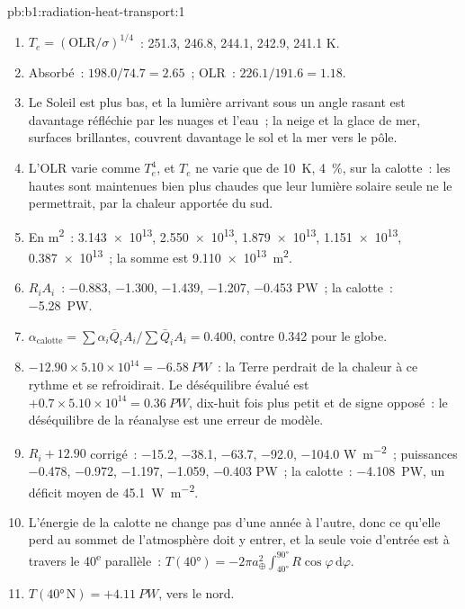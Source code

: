 \begin{solution}{pb:b1:radiation-heat-transport:1}
\begin{enumerate}
  \item $T_e = (\text{OLR}/\sigma)^{1/4}$~: \num{251.3}, \num{246.8}, \num{244.1},
        \num{242.9}, \num{241.1} \unit{K}.
  \item Absorbé~: $198.0/74.7 = 2.65$~; OLR~: $226.1/191.6 = 1.18$.
  \item Le Soleil est plus bas, et la lumière arrivant sous un angle rasant est davantage réfléchie
        par les nuages et l'eau~; la neige et la glace de mer, surfaces brillantes, couvrent davantage le
        sol et la mer vers le pôle.
  \item L'OLR varie comme $T_e^4$, et $T_e$ ne varie que de \qty{10}{K}, \qty{4}{\percent},
        sur la calotte~: les hautes  sont maintenues bien plus chaudes que leur lumière solaire
        seule ne le permettrait, par la chaleur apportée du sud.
  \item En \unit{m^2}~: \num{3.143e13}, \num{2.550e13}, \num{1.879e13},
        \num{1.151e13}, \num{0.387e13}~; la somme est \qty{9.110e13}{m^2}.
  \item $R_iA_i$~: \num{-0.883}, \num{-1.300}, \num{-1.439}, \num{-1.207},
        \num{-0.453} \unit{PW}~; la calotte~: \qty{-5.28}{PW}.
  \item $\alpha_\text{calotte} = \sum\alpha_i\bar Q_iA_i/\sum\bar Q_iA_i = 0.400$,
        contre \num{0.342} pour le globe.
  \item $-12.90 \times 5.10\times10^{14} = \qty{-6.58}{PW}$~: la Terre perdrait
        de la chaleur à ce rythme et se refroidirait. Le déséquilibre évalué est
        $+0.7 \times 5.10\times10^{14} = \qty{+0.36}{PW}$, dix-huit fois plus petit et
        de signe opposé~: le déséquilibre de la réanalyse est une erreur de modèle.
  \item $R_i + 12.90$ corrigé~: \num{-15.2}, \num{-38.1}, \num{-63.7},
        \num{-92.0}, \num{-104.0} \unit{W.m^{-2}}~; puissances \num{-0.478},
        \num{-0.972}, \num{-1.197}, \num{-1.059}, \num{-0.403} \unit{PW}~; la calotte~:
        \qty{-4.108}{PW}, un déficit moyen de \qty{45.1}{W.m^{-2}}.
  \item L'énergie de la calotte ne change pas d'une année à l'autre, donc ce qu'elle perd au
        sommet de l'atmosphère doit y entrer, et la seule voie d'entrée est à travers le
        40\textsuperscript{e} parallèle~: $T(\ang{40}) = -2\pi a_\oplus^2\int_{\ang{40}}^{\ang{90}}
        R\cos\varphi\,\mathrm d\varphi$.
  \item $T(\ang{40}\,\text{N}) = +\qty{4.11}{PW}$, vers le nord.

\end{enumerate}
\end{solution}
